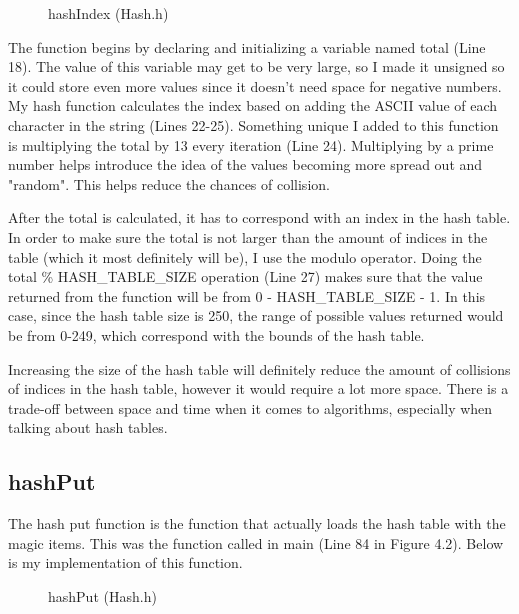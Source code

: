 \documentclass[letterpaper, 10pt]{article}
\begin{document}
\begin{figure}[H]
  \centering
  
  \caption{hashIndex (Hash.h)}
  \label{fig:figure4.3}
\end{figure}

\noindent
The function begins by declaring and initializing a variable named total (Line 18). The value of this variable may get to be very large, so I made it unsigned so it could store even more values since it doesn't need space for negative numbers. My hash function calculates the index based on adding the ASCII value of each character in the string (Lines 22-25). Something unique I added to this function is multiplying the total by 13 every iteration (Line 24). Multiplying by a prime number helps introduce the idea of the values becoming more spread out and "random". This helps reduce the chances of collision.

\vspace{1em}

\noindent
After the total is calculated, it has to correspond with an index in the hash table. In order to make sure the total is not larger than the amount of indices in the table (which it most definitely will be), I use the modulo operator. Doing the total \% HASH\_TABLE\_SIZE operation (Line 27) makes sure that the value returned from the function will be from 0 - HASH\_TABLE\_SIZE - 1. In this case, since the hash table size is 250, the range of possible values returned would be from 0-249, which  correspond with the bounds of the hash table.

\vspace{1em}

\noindent
Increasing the size of the hash table will definitely reduce the amount of collisions of indices in the hash table, however it would require a lot more space. There is a trade-off between space and time when it comes to algorithms, especially when talking about hash tables. 

\subsection{hashPut}
\noindent
The hash put function is the function that actually loads the hash table with the magic items. This was the function called in main (Line 84 in Figure 4.2). Below is my implementation of this function.

\begin{figure}[H]
  \centering
  
  \caption{hashPut (Hash.h)}
  \label{fig:figure4.4}
\end{figure}
\end{document}
